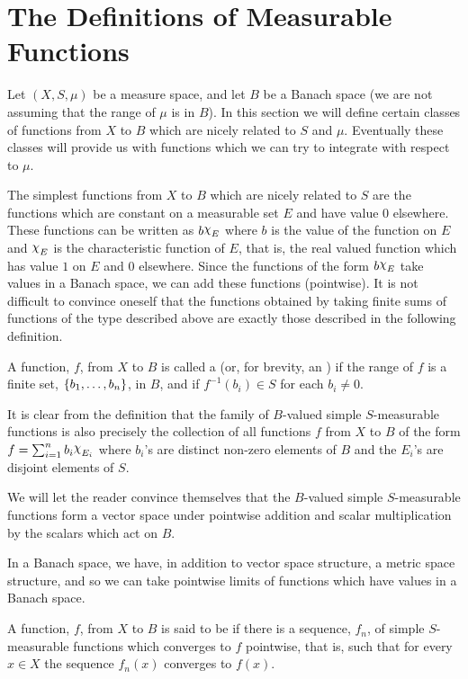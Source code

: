 
\section{The Definitions of Measurable Functions}

Let $(X,S,\mu)$ be a measure space, and let $B$ be a Banach space (we are not assuming that the range of $\mu$ is in $B$). In this section we will define certain classes of functions from $X$ to $B$ which are nicely related to $S$ and $\mu$. Eventually these classes will provide us with functions which we can try to integrate with respect to $\mu$.

The simplest functions from $X$ to $B$ which are nicely related to $S$ are the functions which are constant on a measurable set $E$ and have value 0 elsewhere. These functions can be written as $b\idf{E}$ where $b$ is the value of the function on $E$ and $\idf{E}$ is the characteristic function of $E$, that is, the real valued function which has value $1$ on $E$ and 0 elsewhere. Since the functions of the form $b\idf{E}$ take values in a Banach space, we can add these functions (pointwise). It is not difficult to convince oneself that the functions obtained by taking finite sums of functions of the type described above are exactly those described in the following definition.

\begin{definition}
A function, $f$, from $X$ to $B$ is called a  (or, for brevity, an ) if the range of $f$ is a finite set, $\left\{b_1,\dots,b_n\right\}$, in $B$, and if $f^{-1}(b_i)\in S$ for each $b_i\neq0$.
\end{definition}

It is clear from the definition that the family of $B$-valued simple $S$-measurable functions is also precisely the collection of all functions $f$ from $X$ to $B$ of the form $f=\sum_{i=1}^nb_i\idf{E_i}$ where $b_i$'s are distinct non-zero elements of $B$ and the $E_i$'s are disjoint elements of $S$.

We will let the reader convince themselves that the $B$-valued simple $S$-measurable functions form a vector space under pointwise addition and scalar multiplication by the scalars which act on $B$.

In a Banach space, we have, in addition to vector space structure, a metric space structure, and so we can take pointwise limits of functions which have values in a Banach space.

\begin{definition}
A function, $f$, from $X$ to $B$ is said to be  if there is a sequence, $f_n$, of simple $S$-measurable functions which converges to $f$ pointwise, that is, such that for every $x\in X$ the sequence $f_n(x)$ converges to $f(x)$.
\end{definition}

